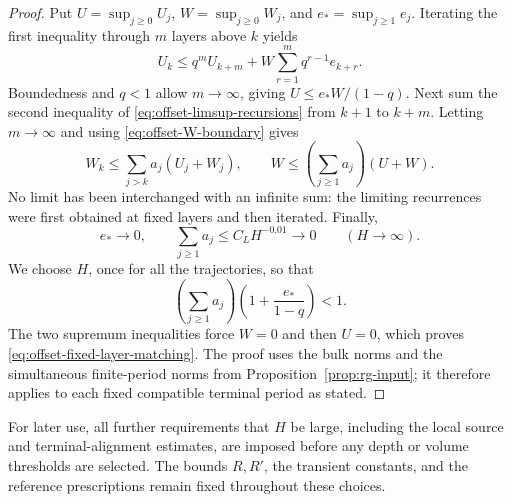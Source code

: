 \begin{proof}
Put $U=\sup_{j\ge0}U_j$, $W=\sup_{j\ge0}W_j$, and
$e_* =\sup_{j\ge1}e_j$.  Iterating the first inequality through
$m$ layers above $k$ yields
\[
 U_k\le q^m U_{k+m}
             +W\sum_{r=1}^{m}q^{r-1}e_{k+r}.
\]
Boundedness and $q<1$ allow $m\to\infty$, giving
$U\le e_*W/(1-q)$.  Next sum the second inequality of
\eqref{eq:offset-limsup-recursions} from $k+1$ to $k+m$.
Letting $m\to\infty$ and using \eqref{eq:offset-W-boundary}
gives
\[
 W_k\le\sum_{j>k}a_j(U_j+W_j),\qquad
 W\le\left(\sum_{j\ge1}a_j\right)(U+W).
\]
No limit has been interchanged with an infinite sum: the limiting
recurrences were first obtained at fixed layers and then iterated.
Finally,
\[
 e_*\longrightarrow0,\qquad
 \sum_{j\ge1}a_j\le C_LH^{-0.01}\longrightarrow0
                  \qquad(H\longrightarrow\infty).
\]
We choose $H$, once for all the trajectories, so that
\[
 \left(\sum_{j\ge1}a_j\right)
                  \left(1+\frac{e_*}{1-q}\right)<1.
\]
The two supremum inequalities force $W=0$ and then $U=0$,
which proves \eqref{eq:offset-fixed-layer-matching}.  The proof
uses the bulk norms and the simultaneous finite-period norms from
Proposition~\ref{prop:rg-input}; it therefore applies to each fixed
compatible terminal period as stated.
\end{proof}

For later use, all further requirements that $H$ be large, including
the local source and terminal-alignment estimates, are imposed before
any depth or volume thresholds are selected.  The bounds $R,R'$,
the transient constants, and the reference prescriptions remain fixed
throughout these choices.
